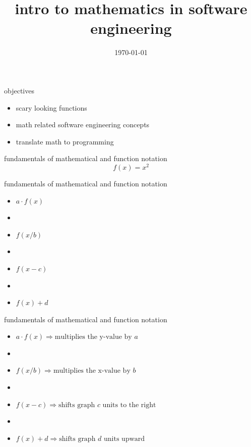 \documentclass{beamer}
\title{intro to mathematics in software engineering}
\institute{Fontys University of Applied Sciences}
\date{\today}
\begin{document}
	
	\begin{frame}
		\titlepage
	\end{frame}
	
	\begin{frame}{objectives}
		\begin{itemize}
			\item[] scary looking functions
			\item[] math related software engineering concepts
			\item[] translate math to programming
		\end{itemize}
	\end{frame}
	
	\begin{frame}{fundamentals of mathematical and function notation}
		$$f(x)=x^2$$
	\end{frame}
	
	\begin{frame}{fundamentals of mathematical and function notation}
		\begin{itemize}
			\item[] $a\cdot f(x)$
			\item[]
			\item[] $f(x/b)$
			\item[]
			\item[] $f(x-c)$
			\item[]
			\item[] $f(x)+d$
		\end{itemize}
	\end{frame}
	
	\begin{frame}{fundamentals of mathematical and function notation}
		\begin{itemize}
			\item[] $a\cdot f(x) \Rightarrow \text{multiplies the y-value by } a$
			\item[]
			\item[] $f(x/b) \Rightarrow \text{multiplies the x-value by } b$
			\item[]
			\item[] $f(x-c) \Rightarrow \text{shifts graph } c \text{ units to the right}$
			\item[]
			\item[] $f(x)+d \Rightarrow \text{shifts graph } d \text{ units upward}$
		\end{itemize}
	\end{frame}
\end{document}

